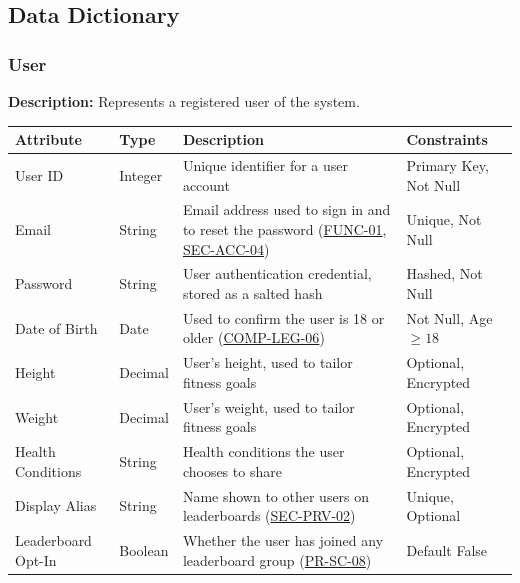 \documentclass[12pt]{article}
\begin{document}
\subsection{Data Dictionary}

\subsubsection{User} 

\textbf{Description:} Represents a registered user of the system.

\begin{xltabular}{\textwidth}{|p{3cm}|p{2cm}|X|p{3cm}|} 
    \hline 
    \textbf{Attribute} & \textbf{Type} & \textbf{Description} & \textbf{Constraints} \\ 
    \hline
    
    User ID & Integer & Unique identifier for a user account & Primary Key, Not Null \\ 
    \hline 
    
    Email & String & Email address used to sign in and to reset the password (\hyperlink{req:FUNC-01}{FUNC-01}, \hyperlink{req:SEC-ACC-04}{SEC-ACC-04}) & Unique, Not Null \\ 
    \hline 
    
    Password & String & User authentication credential, stored as a salted hash & Hashed, Not Null \\ 
    \hline 
    
    Date of Birth & Date & Used to confirm the user is 18 or older (\hyperlink{req:COMP-LEG-06}{COMP-LEG-06}) & Not Null, Age $\geq 18$ \\ 
    \hline 
    
    Height & Decimal & User's height, used to tailor fitness goals & Optional, Encrypted \\ 
    \hline 
    
    Weight & Decimal & User's weight, used to tailor fitness goals & Optional, Encrypted \\ 
    \hline 
    
    Health Conditions & String & Health conditions the user chooses to share & Optional, Encrypted \\ 
    \hline 
    
    Display Alias & String & Name shown to other users on leaderboards (\hyperlink{req:SEC-PRV-02}{SEC-PRV-02}) & Unique, Optional \\ 
    \hline 
    
    Leaderboard Opt-In & Boolean & Whether the user has joined any leaderboard group (\hyperlink{req:PR-SC-08}{PR-SC-08}) & Default False \\ 
    \hline 
    

\end{xltabular}
\end{document}
